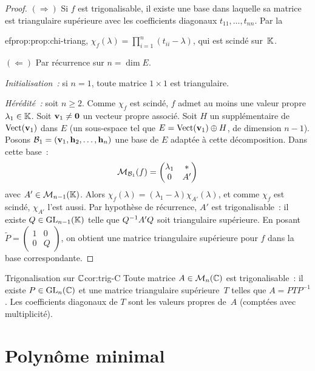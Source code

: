 \begin{proof}
  \emph{$(\Rightarrow)$} Si $f$ est trigonalisable, il existe une base
  dans laquelle sa matrice est triangulaire supérieure avec les
  coefficients diagonaux $t_{11},\ldots,t_{nn}$. Par la
  
ef{prop:prop:chi-triang}, $\chi_f(\lambda)=\prod_{i=1}^n(t_{ii}-\lambda)$,
  qui est scindé sur~${\mathbb{K}}$.

  \emph{$(\Leftarrow)$} Par récurrence sur $n=\dim E$.

  \emph{Initialisation~:} si $n=1$, toute matrice $1\times 1$ est
  triangulaire.

  \emph{Hérédité~:} soit $n\geq 2$. Comme $\chi_f$ est scindé, $f$
  admet au moins une valeur propre $\lambda_1\in{\mathbb{K}}$. Soit
  $\mathbf{v}_1\neq\mathbf{0}$ un vecteur propre associé. Soit $H$ un
  supplémentaire de $\operatorname{Vect}(\mathbf{v}_1)$ dans $E$ (un sous-espace tel
  que $E=\operatorname{Vect}(\mathbf{v}_1)\oplus H$, de dimension $n-1$). Posons
  ${\mathcal{B}}_1=(\mathbf{v}_1,\mathbf{h}_2,\ldots,\mathbf{h}_n)$ une base de $E$
  adaptée à cette décomposition. Dans cette base~:
  \[
    \mathcal{M}_{{\mathcal{B}}_1}(f)=\begin{pmatrix}\lambda_1 & * \\ 0 & A'\end{pmatrix}
  \]
  avec $A'\in\mathcal{M}_{n-1}({\mathbb{K}})$. Alors
  $\chi_f(\lambda)=(\lambda_1-\lambda)\chi_{A'}(\lambda)$, et comme
  $\chi_f$ est scindé, $\chi_{A'}$ l'est aussi. Par hypothèse de
  récurrence, $A'$ est trigonalisable~: il existe $Q\in\operatorname{GL}_{n-1}({\mathbb{K}})$
  telle que ${Q}^{-1}A'Q$ soit triangulaire supérieure. En posant
  $\tilde{P}=\begin{pmatrix}1&0\\0&Q\end{pmatrix}$, on obtient une
  matrice triangulaire supérieure pour $f$ dans la base correspondante.
\end{proof}

\begin{corollary}{Trigonalisation sur ${\mathbb{C}}$}{cor:trig-C}
  Toute matrice $A\in\mathcal{M}_n({\mathbb{C}})$ est trigonalisable~: il existe
  $P\in\operatorname{GL}_n({\mathbb{C}})$ et une matrice triangulaire supérieure~$T$ telles que
  $A=PTP^{-1}$. Les coefficients diagonaux de $T$ sont les valeurs
  propres de~$A$ (comptées avec multiplicité).
\end{corollary}

\section{Polynôme minimal}\label{sec:poly-min}

